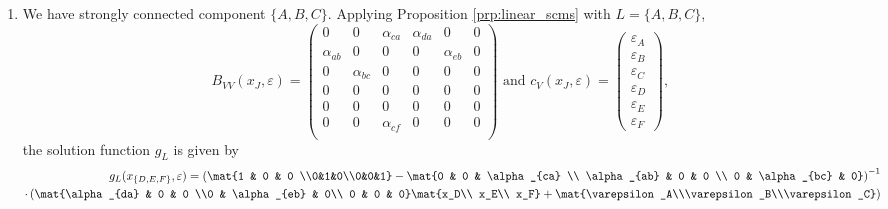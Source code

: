\begin{enumerate}[label=11.\arabic*]
	\begin{gradedsolution}
		\begin{enumerate}
			\item {} We have strongly connected component $\{A, B, C\}$. Applying Proposition \ref*{prp:linear_scms} with $L = \{A, B, C\}$,
			\begin{equation*}
				B_{VV}(x_J, \varepsilon) = \begin{pmatrix}
					0           & 0           & \alpha_{ca} & \alpha_{da} & 0           & 0 \\
					\alpha_{ab} & 0           & 0           & 0           & \alpha_{eb} & 0 \\
					0           & \alpha_{bc} & 0           & 0           & 0           & 0 \\
					0           & 0           & 0           & 0           & 0           & 0 \\
					0           & 0           & 0           & 0           & 0           & 0 \\
					0           & 0           & \alpha_{cf} & 0           & 0           & 0 \\
				\end{pmatrix}
				\text{ and }
				c_V(x_J, \varepsilon) = \begin{pmatrix}
					\varepsilon_A \\ \varepsilon_B \\ \varepsilon_C \\ \varepsilon_D \\ \varepsilon_E \\ \varepsilon_F
				\end{pmatrix},
			\end{equation*}
			the solution function $g_L$ is given by
			\begin{align*}
				g_L(x_{\{D, E, F\}}, \varepsilon) = \left(\mat{1 & 0           & 0              \\0&1&0\\0&0&1} - \mat{0 & 0 & \alpha_{ca}  \\
				\alpha_{ab}                                      & 0           & 0              \\
				0                                                & \alpha_{bc} & 0}\right)^{-1} \\
				\cdot \left(\mat{\alpha_{da}                     & 0           & 0              \\0 & \alpha_{eb} & 0\\ 0 & 0 & 0}\mat{x_D\\ x_E\\ x_F} + \mat{\varepsilon_A\\\varepsilon_B\\\varepsilon_C}\right)

\end{align*}
\end{enumerate}
\end{gradedsolution}
\end{enumerate}
